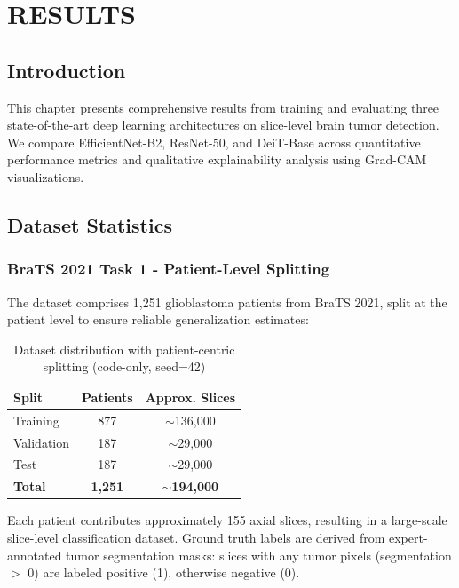 \chapter{RESULTS}
\label{ch:results}

\section{Introduction}

This chapter presents comprehensive results from training and evaluating three state-of-the-art deep learning architectures on slice-level brain tumor detection. We compare EfficientNet-B2, ResNet-50, and DeiT-Base across quantitative performance metrics and qualitative explainability analysis using Grad-CAM visualizations.

\section{Dataset Statistics}

\subsection{BraTS 2021 Task 1 - Patient-Level Splitting}

The dataset comprises 1,251 glioblastoma patients from BraTS 2021, split at the patient level to ensure reliable generalization estimates:

\begin{table}[h]
\centering
\caption{Dataset distribution with patient-centric splitting (code-only, seed=42)}
\label{tab:dataset_stats}
\begin{tabular}{lcc}
\toprule
\textbf{Split} & \textbf{Patients} & \textbf{Approx. Slices} \\
\midrule
Training & 877 & $\sim$136,000 \\
Validation & 187 & $\sim$29,000 \\
Test & 187 & $\sim$29,000 \\
\midrule
\textbf{Total} & \textbf{1,251} & $\sim$\textbf{194,000} \\
\bottomrule
\end{tabular}
\end{table}

\noindent Each patient contributes approximately 155 axial slices, resulting in a large-scale slice-level classification dataset. Ground truth labels are derived from expert-annotated tumor segmentation masks: slices with any tumor pixels (segmentation $>$ 0) are labeled positive (1), otherwise negative (0).

